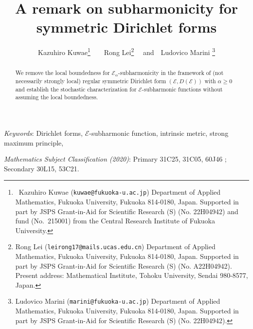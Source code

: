 \documentclass[12pt,a4paper]{article}
\title{\large\bf A remark on subharmonicity for symmetric Dirichlet forms}
\author{
Kazuhiro Kuwae\footnote{\Letter\, Kazuhiro Kuwae ({\tt kuwae@fukuoka-u.ac.jp})
Department of Applied Mathematics, Fukuoka University, Fukuoka 814-0180, Japan. 
Supported in part by JSPS Grant-in-Aid for Scientific Research (S) (No. 22H04942) and fund (No.~215001) from the Central Research Institute of Fukuoka University.}\ \ \ \ 
Rong Lei\footnote{Rong Lei ({\tt leirong17@mails.ucas.edu.cn}) 
Department of Applied Mathematics, Fukuoka University,
Fukuoka 814-0180, Japan. 
Supported in part by JSPS Grant-in-Aid for Scientific Research (S) (No. A22H04942).
Present address: Mathematical Institute, Tohoku University, 
Sendai 980-8577, Japan.}
\ \ and\ \
Ludovico Marini \footnote{Ludovico Marini ({\tt marini@fukuoka-u.ac.jp}) 
Department of Applied Mathematics, Fukuoka University,
Fukuoka 814-0180, Japan. Supported in part by JSPS Grant-in-Aid for Scientific Research (S) (No. 22H04942).}
}
\date{}
\newcommand{\1}{{\bf 1}}
\begin{document}
\maketitle

\begin{abstract}
We remove the local boundedness for 
$\mathscr{E}_{\alpha}$-subharmonicity in the framework of  
(not necessarily strongly local) regular symmetric Dirichlet form $(\mathscr{E},D(\mathscr{E}))$ with $\alpha\geq0$ and establish 
the stochastic characterization for $\mathscr{E}$-subharmonic functions without assuming the local boundedness.
\end{abstract}

{\it Keywords}:  Dirichlet forms, 
$\mathscr{E}$-subharmonic function, intrinsic metric, 
strong maximum principle, 

{\it Mathematics Subject Classification (2020)}: Primary 
31C25, 31C05, 60J46 ; Secondary 30L15, 53C21.


 
\end{document}

